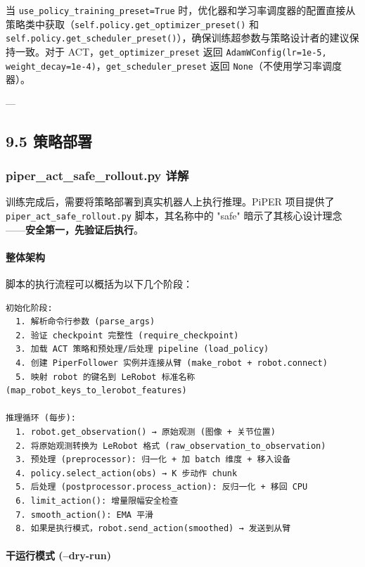 \documentclass[UTF8,a4paper,11pt]{ctexart}
\begin{document}
{当 \texttt{use_policy_training_preset=True} 时，优化器和学习率调度器的配置直接从策略类中获取（\texttt{self.policy.get_optimizer_preset()} 和 \texttt{self.policy.get_scheduler_preset()}），确保训练超参数与策略设计者的建议保持一致。对于 ACT，\texttt{get_optimizer_preset} 返回 \texttt{AdamWConfig(lr=1e-5, weight_decay=1e-4)}，\texttt{get_scheduler_preset} 返回 \texttt{None}（不使用学习率调度器）。

---

\subsection{9.5 策略部署}

\subsubsection{piper_act_safe_rollout.py 详解}

训练完成后，需要将策略部署到真实机器人上执行推理。PiPER 项目提供了 \texttt{piper_act_safe_rollout.py} 脚本，其名称中的 "safe" 暗示了其核心设计理念——\textbf{安全第一，先验证后执行}。

\paragraph{整体架构}


脚本的执行流程可以概括为以下几个阶段：

\begin{lstlisting}[language=text]
初始化阶段:
  1. 解析命令行参数 (parse_args)
  2. 验证 checkpoint 完整性 (require_checkpoint)
  3. 加载 ACT 策略和预处理/后处理 pipeline (load_policy)
  4. 创建 PiperFollower 实例并连接从臂 (make_robot + robot.connect)
  5. 映射 robot 的键名到 LeRobot 标准名称 (map_robot_keys_to_lerobot_features)

推理循环 (每步):
  1. robot.get_observation() → 原始观测 (图像 + 关节位置)
  2. 将原始观测转换为 LeRobot 格式 (raw_observation_to_observation)
  3. 预处理 (preprocessor): 归一化 + 加 batch 维度 + 移入设备
  4. policy.select_action(obs) → K 步动作 chunk
  5. 后处理 (postprocessor.process_action): 反归一化 + 移回 CPU
  6. limit_action(): 增量限幅安全检查
  7. smooth_action(): EMA 平滑
  8. 如果是执行模式，robot.send_action(smoothed) → 发送到从臂
\end{lstlisting}

\paragraph{干运行模式 (--dry-run)}


}
\end{document}
